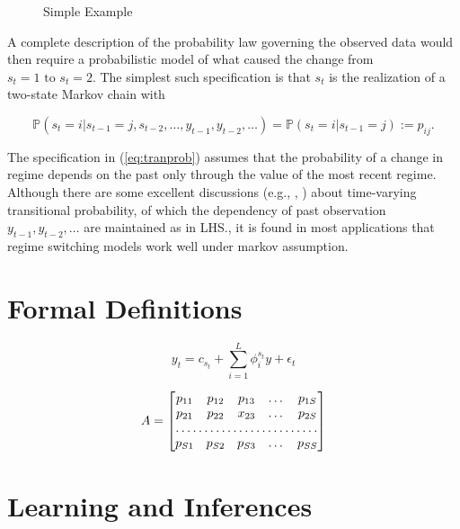 \documentclass[a4paper]{article}
\let\oldref\ref
\renewcommand{\ref}[1]{(\oldref{#1})}
\begin{document}
\begin{figure}[!h]
\centering

\caption{Simple Example}
\end{figure}

A complete description of the probability law governing the observed data would then require a probabilistic model of what caused the change from $s_t = 1 \text{ to } s_t = 2$. The simplest such specification is that $s_t$ is the realization of a two-state Markov chain with

\begin{equation} \label{eq:tranprob}
\mathbb{P}(s_t = i | s_{t-1} = j, s_{t-2}, \dots, y_{t-1}, y_{t-2}, \dots) = \mathbb{P}(s_t = i | s_{t-1} = j) := p_{ij}.
\end{equation}

The specification in \ref{eq:tranprob} assumes that the probability of a change in regime depends on the past only through the value of the most recent regime. Although there are some excellent discussions (e.g., \cite{dieb94}, \cite{fil94}) about time-varying transitional probability, of which the dependency of past observation $y_{t-1}, y_{t-2} , \dots$ are maintained as in LHS., it is found in most applications that regime switching models work well under markov assumption.

\section*{Formal Definitions}

\begin{equation}
y_t = c_{s_t} + \sum_{i=1}^L \phi_i^{s_t} y + \epsilon_t
\end{equation}

\begin{equation}
A=
\begin{bmatrix}
    p_{11}       & p_{12} & p_{13} & \dots & p_{1S} \\
    p_{21}       & p_{22} & x_{23} & \dots & p_{2S} \\
    \hdotsfor{5} \\
    p_{S1}       & p_{S2} & p_{S3} & \dots & p_{SS}
\end{bmatrix}
\end{equation}

\section*{Learning and Inferences}
\end{document}
